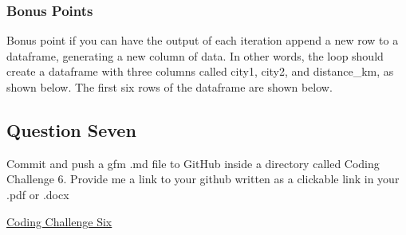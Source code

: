 \documentclass[
  12pt,
]{article}
\begin{document}
\subsubsection{Bonus Points}\label{bonus-points}

Bonus point if you can have the output of each iteration append a new
row to a dataframe, generating a new column of data. In other words, the
loop should create a dataframe with three columns called city1, city2,
and distance\_km, as shown below. The first six rows of the dataframe
are shown below.

\subsection{Question Seven}\label{question-seven}

Commit and push a gfm .md file to GitHub inside a directory called
Coding Challenge 6. Provide me a link to your github written as a
clickable link in your .pdf or .docx

\href{https://github.com/Mads-Hamrick/ENTM6820class/tree/9c303debe9565060bec454ea4d538b01e052f478/2025_4_4_CodingChallengeSix_mer0127}{Coding
Challenge Six}
\end{document}
